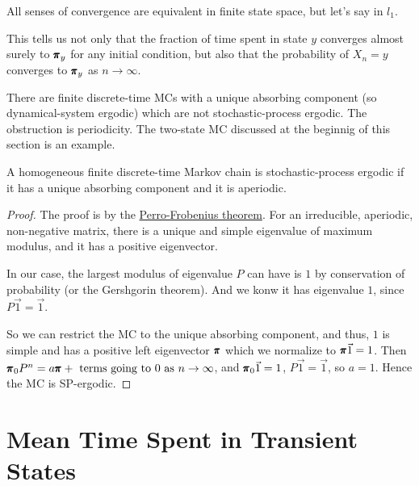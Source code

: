 \begin{remark}
    All senses of convergence are equivalent in finite state space, but let's say in $l_1$.
\end{remark}

\begin{remark}
    This tells us not only that the fraction of time spent in state $y$ converges almost surely to $\pmb{\pi}_y$ for any initial condition, but also that the probability of $X_n = y$ converges to $\pmb{\pi}_y$ as $n \to \infty$.
\end{remark}

\begin{remark}
    There are finite discrete-time MCs with a unique absorbing component (so dynamical-system ergodic) which are not stochastic-process ergodic. The obstruction is periodicity. The two-state MC discussed at the beginnig of this section is an example.
\end{remark}

\begin{theorem}
    A homogeneous finite discrete-time Markov chain is stochastic-process ergodic if it has a unique absorbing component and it is aperiodic.
    \begin{proof}
        The proof is by the \href{https://en.wikipedia.org/wiki/Perron%E2%80%93Frobenius_theorem}{Perro-Frobenius theorem}. For an irreducible, aperiodic, non-negative matrix, there is a unique and simple eigenvalue of maximum modulus, and it has a positive eigenvector. 

        In our case, the largest modulus of eigenvalue $P$ can have is $1$ by conservation of probability (or the Gershgorin theorem).
        And we konw it has eigenvalue $1$, since $P \vec{1} = \vec{1}$.

        So we can restrict the MC to the unique absorbing component, and thus, $1$ is simple and has a positive left eigenvector $\pmb{\pi}$ which we normalize to $\pmb{\pi} \vec{1} = 1$. Then $\pmb{\pi}_0 P^n = a \pmb{\pi} + \text{ terms going to }0 \text{ as }n \to \infty$, and $\pmb{\pi}_0 \vec{1} = 1$, $P \vec{1} = \vec{1}$, so $a = 1$. Hence the MC is SP-ergodic.
    \end{proof}
\end{theorem}


\section{Mean Time Spent in Transient States}

